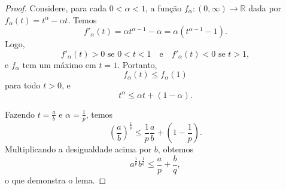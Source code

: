 \begin{proof}
    Considere, para cada $0 < \alpha < 1$, a função $f_\alpha : (0, \infty) \to \mathbb{R}$ dada por $f_\alpha(t) = t^\alpha - \alpha t$. Temos
    \begin{equation*}
        f'_\alpha(t) = \alpha t^{\alpha - 1} - \alpha = \alpha(t^{\alpha - 1} - 1).
    \end{equation*}
    Logo,
    \begin{equation*}
        f'_\alpha(t) > 0 \text{ se } 0 < t < 1
        \quad \text{e} \quad
        f'_\alpha(t) < 0 \text{ se } t > 1,
    \end{equation*}
    e $f_\alpha$ tem um máximo em $t = 1$. Portanto,
    \begin{equation*}
        f_\alpha(t) \leq f_\alpha(1)
    \end{equation*}
    para todo $t > 0$, e
    \begin{equation*}
        t^\alpha \leq \alpha t + (1 - \alpha).
    \end{equation*}

    Fazendo $t = \frac{a}{b}$ e $\alpha = \frac{1}{p}$, temos
    \begin{equation*}
        \left( \frac{a}{b} \right)^{\frac{1}{p}} \leq \frac{1}{p} \frac{a}{b} + \left(1 - \frac{1}{p}\right).
    \end{equation*}
    Multiplicando a desigualdade acima por $b$, obtemos
    \begin{equation*}
        a^{\frac{1}{p}} b^{\frac{1}{q}} \leq \frac{a}{p} + \frac{b}{q},
    \end{equation*}
    o que demonstra o lema.
\end{proof}